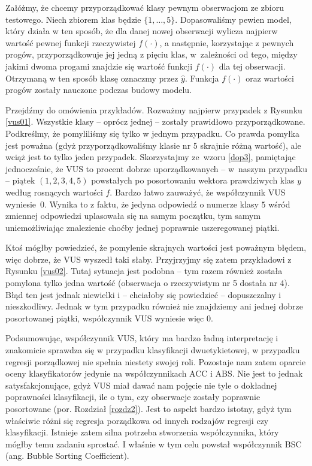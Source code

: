 \documentclass{mini}
\begin{document}
Załóżmy, że chcemy przyporządkować klasy pewnym obserwacjom ze zbioru testowego. Niech zbiorem klas będzie $\lbrace 1, \ldots, 5\rbrace$. Dopasowaliśmy pewien model, który działa w ten sposób, że dla danej nowej obserwacji wylicza najpierw wartość pewnej funkcji rzeczywistej $f(\cdot)$, a następnie, korzystając z pewnych progów, przyporządkowuje jej jedną z pięciu klas, w~zależności od tego, między jakimi dwoma progami znajdzie się wartość funkcji $f(\cdot)$ dla tej obserwacji. Otrzymaną w ten sposób klasę oznaczmy przez $\hat{y}$. Funkcja $f(\cdot)$ oraz wartości progów zostały nauczone podczas budowy modelu. 

Przejdźmy do omówienia przykładów. Rozważmy najpierw przypadek z Rysunku \ref{vus01}. Wszystkie klasy -- oprócz jednej -- zostały prawidłowo przyporządkowane. Podkreślmy, że pomyliliśmy się tylko w jednym przypadku. Co prawda pomyłka jest poważna (gdyż przyporządkowaliśmy klasie nr $5$ skrajnie różną wartość), ale wciąż jest to tylko jeden przypadek. Skorzystajmy ze~wzoru \eqref{dop3}, pamiętając jednocześnie, że VUS to procent dobrze uporządkowanych -- w~naszym przypadku -- piątek $(1, 2, 3, 4, 5)$ powstałych po posortowaniu wektora prawdziwych klas $y$ według rosnących wartości $f$. Bardzo łatwo zauważyć, że współczynnik VUS wyniesie~$0$. Wynika to z faktu, że jedyna odpowiedź o numerze klasy $5$ wśród zmiennej odpowiedzi uplasowała się na samym początku, tym samym uniemożliwiając znalezienie choćby jednej poprawnie uszeregowanej piątki.

Ktoś mógłby powiedzieć, że pomylenie skrajnych wartości jest poważnym błędem, więc dobrze, że VUS wyszedł taki słaby. Przyjrzyjmy się zatem przykładowi z Rysunku \ref{vus02}. Tutaj sytuacja jest podobna -- tym razem również została pomylona tylko jedna wartość (obserwacja o rzeczywistym nr 5 dostała nr 4). Błąd ten jest jednak niewielki i -- chciałoby się powiedzieć -- dopuszczalny i nieszkodliwy. Jednak w tym przypadku również nie znajdziemy ani jednej dobrze posortowanej piątki, współczynnik VUS wyniesie więc $0$.      

Podsumowując, współczynnik VUS, który ma bardzo ładną interpretację i znakomicie sprawdza się w przypadku klasyfikacji dwuetykietowej, w przypadku regresji porządkowej nie spełnia niestety swojej roli. Pozostaje nam zatem oparcie oceny klasyfikatorów jedynie na współczynnikach ACC i ABS. Nie jest to jednak satysfakcjonujące, gdyż VUS miał dawać nam pojęcie nie tyle o dokładnej poprawności klasyfikacji, ile o tym, czy obserwacje zostały poprawnie posortowane (por. Rozdział \ref{rozdz2}). Jest to aspekt bardzo istotny, gdyż tym właściwie różni się regresja porządkowa od innych rodzajów regresji czy klasyfikacji. Istnieje zatem silna potrzeba stworzenia współczynnika, który mógłby temu zadaniu sprostać. I właśnie w tym celu powstał współczynnik BSC (ang. Bubble Sorting Coefficient). 
\end{document}
